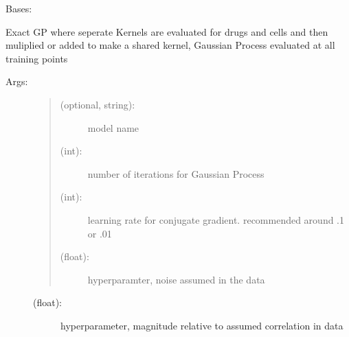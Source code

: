 \documentclass[letterpaper,10pt,english,openany,oneside]{sphinxmanual}
\begin{document}

\begin{fulllineitems}
\label{\detokenize{gp:methods.regressor.ExactGPCompositeKernel.ExactGPCompositeKernelRegression}}
Bases: 

Exact GP where seperate Kernels are evaluated for drugs and cells and then muliplied or added to make a shared kernel, Gaussian Process evaluated at all training points
\begin{description}
\item[{Args:}] \leavevmode\begin{quote}
\begin{description}
\item[{ (optional, string):}] \leavevmode
model name

\item[{ (int):}] \leavevmode
number of iterations for Gaussian Process

\item[{ (int):}] \leavevmode
learning rate for conjugate gradient. recommended around .1 or .01

\item[{ (float):}] \leavevmode
hyperparamter, noise assumed in the data

\end{description}
\end{quote}
\begin{description}
\item[{ (float):}] \leavevmode
hyperparameter, magnitude relative to assumed correlation in  data


\end{description}
\end{description}
\end{fulllineitems}
\end{document}
